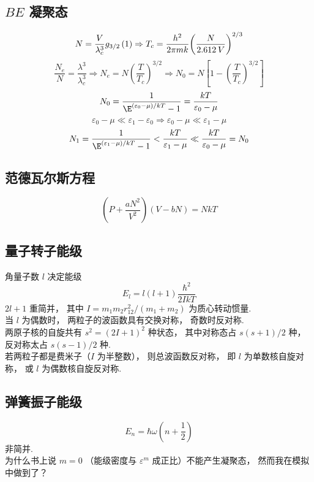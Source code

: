 \subsection{$BE$ 凝聚态}
\begin{equation}
  N = \frac{V}{{\lambda _c^3}}{g_{3/2}}\left( 1 \right) \Rightarrow {T_c} = \frac{{{h^2}}}{{2\pi mk}}{\left( {\frac{N}{{2.612{\kern 1pt} {\kern 1pt} V}}} \right)^{2/3}}
\end{equation}
\begin{equation}
  \frac{{{N_e}}}{N} = \frac{{{\lambda ^3}}}{{\lambda _c^3}} \Rightarrow {N_e} = N{\left( {\frac{T}{{{T_c}}}} \right)^{3/2}} \Rightarrow {N_0} = N\left[ {1 - {{\left( {\frac{T}{{{T_c}}}} \right)}^{3/2}}} \right]
\end{equation}
\begin{equation}
  {N_0} = \frac{1}{{{\E^{({\varepsilon _0} - \mu )/kT}} - 1}} = \frac{{kT}}{{{\varepsilon _0} - \mu }}
\end{equation}
\begin{equation}
  {\varepsilon _0} - \mu  \ll {\varepsilon _1} - {\varepsilon _0} \Rightarrow {\varepsilon _0} - \mu  \ll {\varepsilon _1} - \mu 
\end{equation}
\begin{equation}
  {N_1} = \frac{1}{{{\E^{({\varepsilon _1} - \mu )/kT}} - 1}} < \frac{{kT}}{{{\varepsilon _1} - \mu }} \ll \frac{{kT}}{{{\varepsilon _0} - \mu }} = {N_0}
\end{equation}
\subsection{范德瓦尔斯方程}
\begin{equation}
  \left( {P + \frac{{a{N^2}}}{{{V^2}}}} \right)\left( {V - bN} \right) = NkT
\end{equation}
\subsection{量子转子能级}
角量子数 $l$ 决定能级
\begin{equation}
  {E_l} = l\left( {l + 1} \right)\frac{{{\hbar ^2}}}{{2IkT}}
\end{equation}
$2l+1$ 重简并， 其中 $I = {{{m_1}{m_2}r_{12}^2}}/({{{m_1} + {m_2}}})$ 为质心转动惯量.\\
当 $l$ 为偶数时， 两粒子的波函数具有交换对称， 奇数时反对称.\\
两原子核的自旋共有 ${s^2} = {\left( {2I + 1} \right)^2}$ 种状态， 其中对称态占 ${{s\left( {s + 1} \right)}}/{2}$ 种， 反对称太占 ${{s\left( {s - 1} \right)}}/{2}$ 种.\\
若两粒子都是费米子（$I$ 为半整数）， 则总波函数反对称， 即 $l$ 为单数核自旋对称， 或 $l$ 为偶数核自旋反对称.\\
\subsection{弹簧振子能级}
\begin{equation}
  {E_n} = \hbar \omega \left( {n + \frac{1}{2}} \right)
\end{equation}
非简并.\\
为什么书上说 $m = 0 $ （能级密度与 ${\varepsilon ^m}$ 成正比）不能产生凝聚态， 然而我在模拟中做到了？\\